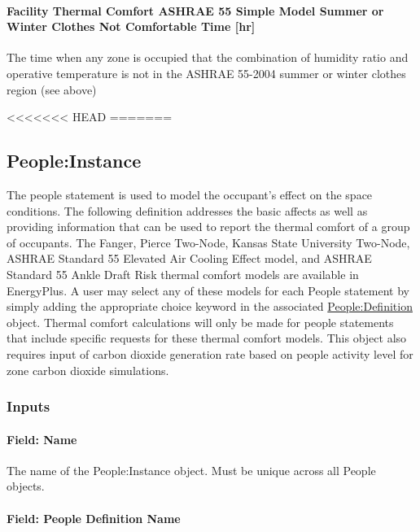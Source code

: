 \paragraph{Facility Thermal Comfort ASHRAE 55 Simple Model Summer or Winter Clothes Not Comfortable Time {[}hr{]}}\label{facility-thermal-comfort-ashrae-55-simple-model-summer-or-winter-clothes-not-comfortable-time-hr}

The time when any zone is occupied that the combination of humidity ratio and operative temperature is not in the ASHRAE 55-2004 summer or winter clothes region (see above)

<<<<<<< HEAD
=======

\subsection{People:Instance}\label{peopleinstance}

The people statement is used to model the occupant's effect on the space conditions. The following definition addresses the basic affects as well as providing information that can be used to report the thermal comfort of a group of occupants. The Fanger, Pierce Two-Node, Kansas State University Two-Node, ASHRAE Standard 55 Elevated Air Cooling Effect model, and ASHRAE Standard 55 Ankle Draft Risk thermal comfort models are available in EnergyPlus. A user may select any of these models for each People statement by simply adding the appropriate choice keyword in the associated \hyperref[peopledefinition]{People:Definition} object. Thermal comfort calculations will only be made for people statements that include specific requests for these thermal comfort models. This object also requires input of carbon dioxide generation rate based on people activity level for zone carbon dioxide simulations.

\subsubsection{Inputs}\label{inputs-025-people-instance}

\paragraph{Field: Name}\label{field-name-024-people-instance}

The name of the People:Instance object. Must be unique across all People objects.

\paragraph{Field: People Definition Name}\label{field-people-definition-name}

